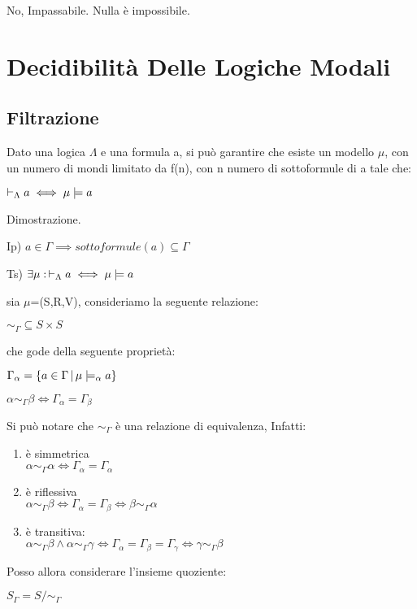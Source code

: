 \begin{savequote}[80mm]
No, Impassabile. Nulla è impossibile.
 \end{savequote}


\chapter{Decidibilità Delle Logiche Modali}


\section{Filtrazione}

Dato una logica $\Lambda$ e una formula a, si può garantire che esiste
un modello $\mu$, con un numero di mondi limitato da f(n), con n
numero di sottoformule di a tale che:

$\vdash_{\Lambda}a\iff\mu\models a$

Dimostrazione.

Ip) $a\in\Gamma\implies sottoformule(a)\subseteq\Gamma$

Ts) $\exists\mu:\,\vdash_{\Lambda}a\iff\mu\models a$

sia $\mu$=(S,R,V), consideriamo la seguente relazione:

$\sim_{\Gamma}\subseteq S\times S$

che gode della seguente proprietà:

$\Gamma_{\alpha}=\{a\in\Gamma\,|\,\mu\models_{\alpha}a\}$

$\alpha\sim_{\Gamma}\beta\iff\Gamma_{\alpha}=\Gamma_{\beta}$

Si può notare che $\sim_{\Gamma}$ è una relazione di equivalenza,
Infatti:
\begin{enumerate}
\item è simmetrica\\
$\alpha\sim_{\Gamma}\alpha\iff\Gamma_{\alpha}=\Gamma_{\alpha}$
\item è riflessiva\\
$\alpha\sim_{\Gamma}\beta\iff\Gamma_{\alpha}=\Gamma_{\beta}\iff\beta\sim_{\Gamma}\alpha$
\item è transitiva:\\
$\alpha\sim_{\Gamma}\beta\wedge\alpha\sim_{\Gamma}\gamma\iff\Gamma_{\alpha}=\Gamma_{\beta}=\Gamma_{\gamma}\iff\gamma\sim_{\Gamma}\beta$
\end{enumerate}
Posso allora considerare l'insieme quoziente:

$S_{\Gamma}=S/\sim_{\Gamma}$

